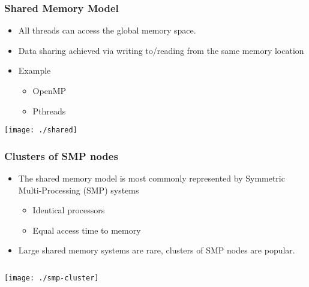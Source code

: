 \documentclass[slidestop,mathserif,compress,xcolor=svgnames]{beamer}
\begin{document}
\begin{frame}
  \frametitle{\small Shared Memory Model}
    \begin{itemize}
      \item All threads can access the global memory space.
      \item Data sharing achieved via writing to/reading from the same memory location
      \item Example
      \begin{itemize}
        \item OpenMP
        \item Pthreads
      \end{itemize}
    \end{itemize}
    \begin{center}
      \texttt{[image: ./shared]}
    \end{center}
\end{frame}


\begin{frame}
  \frametitle{\small Clusters of SMP nodes}
  \begin{itemize}
    \item The shared memory model is most commonly represented by Symmetric Multi-Processing (SMP) systems
    \begin{itemize}
      \item Identical processors
      \item Equal access time to memory
    \end{itemize}
    \item Large shared memory systems are rare, clusters of SMP nodes are popular.
  \end{itemize}
  \begin{columns}
    \column{13cm}
    \begin{center}
      \texttt{[image: ./smp-cluster]}
    \end{center}
  \end{columns}
\end{frame}
\end{document}
